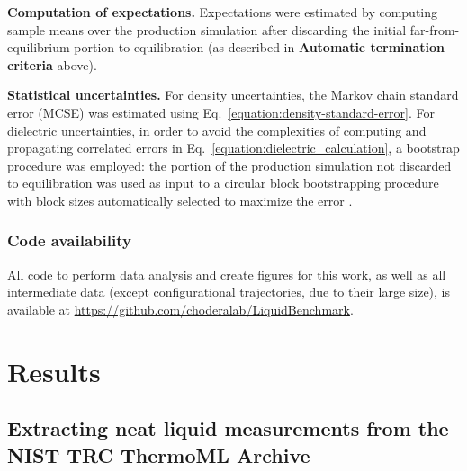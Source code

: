 \documentclass[journal=jacsat,manuscript=article]{achemso}
\begin{document}
{\bf Computation of expectations.}
Expectations were estimated by computing sample means over the production simulation after discarding the initial far-from-equilibrium portion to equilibration (as described in {\bf Automatic termination criteria} above).

{\bf Statistical uncertainties.}
For density uncertainties, the Markov chain standard error (MCSE) was estimated using Eq.~\ref{equation:density-standard-error}.
For dielectric uncertainties, in order to avoid the complexities of computing and propagating correlated errors in Eq.~\ref{equation:dielectric_calculation}, a bootstrap procedure was employed: the portion of the production simulation not discarded to equilibration was used as input to a circular block bootstrapping procedure \cite{sheppard_2015_15681} with block sizes automatically selected to maximize the error \cite{flyvbjerg1989error}.

\subsubsection{Code availability}

All code to perform data analysis and create figures for this work, as well as all intermediate data (except configurational trajectories, due to their large size), is available at \url{https://github.com/choderalab/LiquidBenchmark}.  


\section{Results}

\subsection{Extracting neat liquid measurements from the NIST TRC ThermoML Archive}
\label{section:filtering-thermoml}
\end{document}
